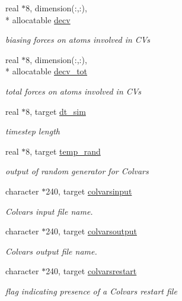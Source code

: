 \begin{DoxyCompactItemize}
real $\ast$8, dimension(\-:,\-:), \\*
allocatable \hyperlink{classcolvars_aae9ea8e5b352351931e03775fc3971e2}{decv}
\begin{DoxyCompactList}\small\item\em biasing forces on atoms involved in C\-Vs \end{DoxyCompactList}\item 
real $\ast$8, dimension(\-:,\-:), \\*
allocatable \hyperlink{classcolvars_a40f16d6e6e70120635372cfb5e81d4be}{decv\-\_\-tot}
\begin{DoxyCompactList}\small\item\em total forces on atoms involved in C\-Vs \end{DoxyCompactList}\item 
real $\ast$8, target \hyperlink{classcolvars_a5354676077248821a35dee43812d4eee}{dt\-\_\-sim}
\begin{DoxyCompactList}\small\item\em timestep length \end{DoxyCompactList}\item 
real $\ast$8, target \hyperlink{classcolvars_a68f638ce8e5d585bbcf7d5c80887c3d2}{temp\-\_\-rand}
\begin{DoxyCompactList}\small\item\em output of random generator for Colvars \end{DoxyCompactList}\item 
character $\ast$240, target \hyperlink{classcolvars_ac0a4109a01ca0d085e554c69b680bae6}{colvarsinput}
\begin{DoxyCompactList}\small\item\em Colvars input file name. \end{DoxyCompactList}\item 
character $\ast$240, target \hyperlink{classcolvars_ace5f8d0a42a5abb1c7323ea9bdf02d1c}{colvarsoutput}
\begin{DoxyCompactList}\small\item\em Colvars output file name. \end{DoxyCompactList}\item 
character $\ast$240, target \hyperlink{classcolvars_a5e868c0de4c9369d799f9dda1dbcb738}{colvarsrestart}
\begin{DoxyCompactList}\small\item\em flag indicating presence of a Colvars restart file \end{DoxyCompactList}\end{DoxyCompactItemize}


